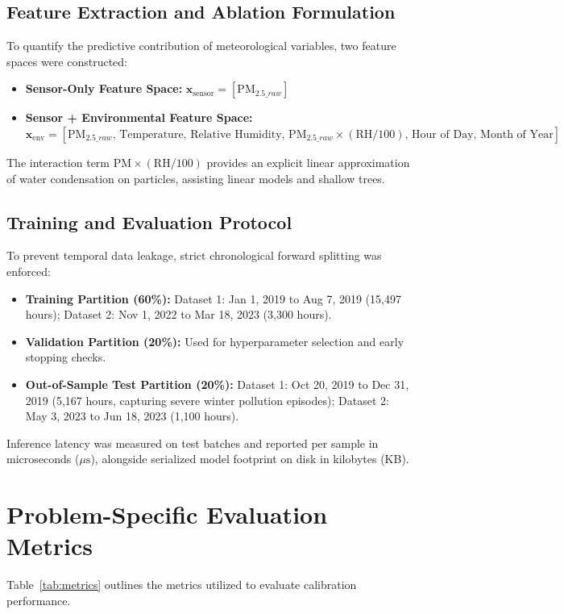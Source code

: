 \documentclass[11pt,a4paper]{article}
\begin{document}
\subsection{Feature Extraction and Ablation Formulation}
To quantify the predictive contribution of meteorological variables, two feature spaces were constructed:
\begin{itemize}
    \item \textbf{Sensor-Only Feature Space:} $\mathbf{x}_{\text{sensor}} = [ \text{PM}_{2.5\_raw} ]$
    \item \textbf{Sensor + Environmental Feature Space:} $\mathbf{x}_{\text{env}} = [ \text{PM}_{2.5\_raw}, \, \text{Temperature}, \, \text{Relative Humidity}, \, \text{PM}_{2.5\_raw} \times (\text{RH}/100), \, \text{Hour of Day}, \, \text{Month of Year} ]$
\end{itemize}
The interaction term $\text{PM} \times (\text{RH}/100)$ provides an explicit linear approximation of water condensation on particles, assisting linear models and shallow trees.

\subsection{Training and Evaluation Protocol}
To prevent temporal data leakage, strict chronological forward splitting was enforced:
\begin{itemize}
    \item \textbf{Training Partition (60\%):} Dataset 1: Jan 1, 2019 to Aug 7, 2019 (15,497 hours); Dataset 2: Nov 1, 2022 to Mar 18, 2023 (3,300 hours).
    \item \textbf{Validation Partition (20\%):} Used for hyperparameter selection and early stopping checks.
    \item \textbf{Out-of-Sample Test Partition (20\%):} Dataset 1: Oct 20, 2019 to Dec 31, 2019 (5,167 hours, capturing severe winter pollution episodes); Dataset 2: May 3, 2023 to Jun 18, 2023 (1,100 hours).
\end{itemize}
Inference latency was measured on test batches and reported per sample in microseconds ($\mu\text{s}$), alongside serialized model footprint on disk in kilobytes (KB).

\section{Problem-Specific Evaluation Metrics}
Table~\ref{tab:metrics} outlines the metrics utilized to evaluate calibration performance.
\end{document}
